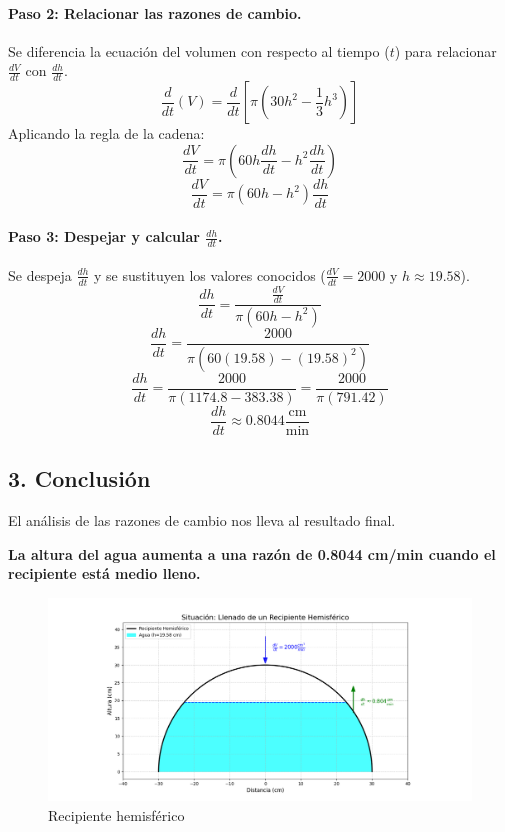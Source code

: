 \documentclass[12pt, letterpaper]{article}
\begin{document}
\paragraph{Paso 2: Relacionar las razones de cambio.}
Se diferencia la ecuación del volumen con respecto al tiempo ($t$) para relacionar $\frac{dV}{dt}$ con $\frac{dh}{dt}$.
$$\frac{d}{dt}(V) = \frac{d}{dt} \left[ \pi \left(30h^2 - \frac{1}{3}h^3\right) \right]$$
Aplicando la regla de la cadena:
$$\frac{dV}{dt} = \pi \left(60h \frac{dh}{dt} - h^2 \frac{dh}{dt}\right)$$
$$\frac{dV}{dt} = \pi (60h - h^2) \frac{dh}{dt}$$

\paragraph{Paso 3: Despejar y calcular $\frac{dh}{dt}$.}
Se despeja $\frac{dh}{dt}$ y se sustituyen los valores conocidos ($\frac{dV}{dt} = 2000$ y $h \approx 19.58$).
$$\frac{dh}{dt} = \frac{\frac{dV}{dt}}{\pi(60h - h^2)}$$
$$\frac{dh}{dt} = \frac{2000}{\pi(60(19.58) - (19.58)^2)}$$
$$\frac{dh}{dt} = \frac{2000}{\pi(1174.8 - 383.38)} = \frac{2000}{\pi(791.42)}$$
$$\frac{dh}{dt} \approx 0.8044 \frac{\text{cm}}{\text{min}}$$

\subsection*{3. Conclusión}
El análisis de las razones de cambio nos lleva al resultado final.
\vspace{1cm}

\begin{center}
\Large \textbf{La altura del agua aumenta a una razón de 0.8044 cm/min cuando el recipiente está medio lleno.}
\end{center}

\begin{figure}[h!]
    \centering
    \includegraphics[width=1.2\textwidth]{Figure_3.png}
    \caption{Recipiente hemisférico}
    \label{fig:Figure_2}
\end{figure}
\end{document}
